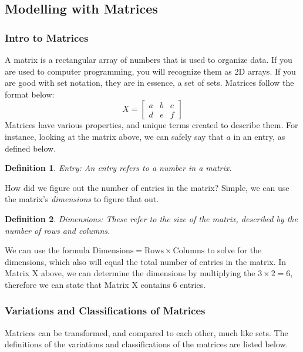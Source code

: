 \documentclass[final,1p,12pt]{elsarticle}
\newtheorem{definition}{Definition}
\begin{document}
    \subsection{Modelling with Matrices}
    
        \subsubsection{Intro to Matrices}
        A matrix is a rectangular array of numbers that is used to organize data. If you are used to computer programming, you will recognize them as 2D arrays. If you are good with set notation, they are in essence, a set of sets. Matrices follow the format below:
        \begin{equation}
            X =
            \begin{bmatrix}
                a & b & c \\
                d & e & f
            \end{bmatrix}
        \end{equation}
        Matrices have various properties, and unique terms created to describe them. For instance, looking at the matrix above, we can safely say that $a$ in an entry, as defined below.
        \begin{definition}Entry:
        An entry refers to a number in a matrix.
        \end{definition}
        How did we figure out the number of entries in the matrix? Simple, we can use the matrix's \emph{dimensions} to figure that out.
        \begin{definition}Dimensions:
        These refer to the size of the matrix, described by the number of rows and columns. 
        \end{definition}
        We can use the formula $\text{Dimensions}=\text{Rows}\times\text{Columns}$ to solve for the dimensions, which also will equal the total number of entries in the matrix. In Matrix X above, we can determine the dimensions by multiplying the $3\times 2=6$, therefore we can state that Matrix X contains 6 entries.
        
        \subsubsection{Variations and Classifications of Matrices}
        Matrices can be transformed, and compared to each other, much like sets. The definitions of the variations and classifications of the matrices are listed below.
        
\end{document}
